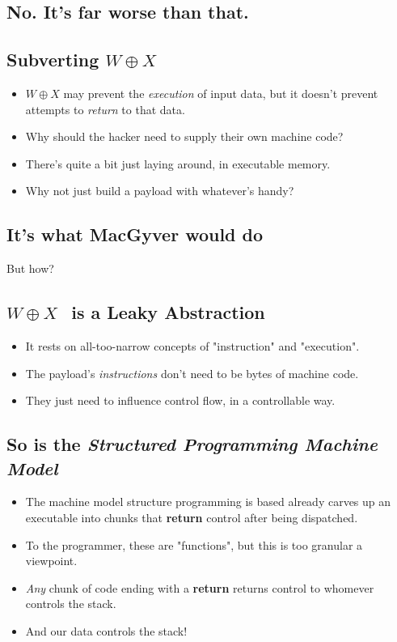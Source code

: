 \documentclass[11pt]{article}
\begin{document}
\subsection*{No. It's far worse than that.}
\label{sec:orgc000ec0}
\subsection*{Subverting \(W\oplus X\)}
\label{sec:org4f4e5be}
\begin{itemize}
\item \(W\oplus X\) may prevent the \emph{execution} of input data, but it doesn't prevent attempts to \emph{return} to that data.
\item Why should the hacker need to supply their own machine code?
\item There's quite a bit just laying around, in executable memory.
\item Why not just build a payload with whatever's handy?
\end{itemize}
\subsection*{It's what MacGyver would do}
\label{sec:org8908343}
But how?
\subsection*{\(W\oplus X~~\) is a Leaky Abstraction}
\label{sec:org7769cc2}
\begin{itemize}
\item It rests on all-too-narrow concepts of "instruction" and "execution".
\item The payload's \emph{instructions} don't need to be bytes of machine code.
\item They just need to influence control flow, in a controllable way.
\end{itemize}
\subsection*{So is the \emph{Structured Programming Machine Model}}
\label{sec:org47e359b}
\begin{itemize}
\item The machine model structure programming is based already carves up an executable into chunks that \textbf{return} control after being dispatched.
\item To the programmer, these are "functions", but this is too granular a viewpoint.
\item \emph{Any} chunk of code ending with a \textbf{return} returns control to whomever controls the stack.
\item And our data controls the stack!
\end{itemize}
\end{document}
